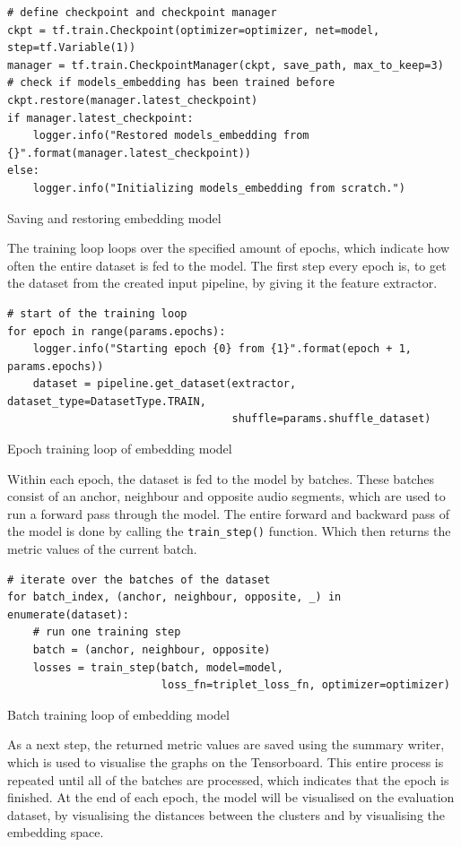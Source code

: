 \begin{code}[htbp]
\begin{verbatim}
# define checkpoint and checkpoint manager
ckpt = tf.train.Checkpoint(optimizer=optimizer, net=model, step=tf.Variable(1))
manager = tf.train.CheckpointManager(ckpt, save_path, max_to_keep=3)
# check if models_embedding has been trained before
ckpt.restore(manager.latest_checkpoint)
if manager.latest_checkpoint:
    logger.info("Restored models_embedding from {}".format(manager.latest_checkpoint))
else:
    logger.info("Initializing models_embedding from scratch.")
\end{verbatim}
\caption{Saving and restoring embedding model}
\label{code:Save-Restore-Embedding-Model}
\end{code}
\noindent
The training loop loops over the specified amount of epochs, which indicate how often the entire dataset is fed to the model. The first step every epoch is, to get the dataset from the created input pipeline, by giving it the feature extractor.

\begin{code}[htbp]
\begin{verbatim}
# start of the training loop
for epoch in range(params.epochs):
    logger.info("Starting epoch {0} from {1}".format(epoch + 1, params.epochs))
    dataset = pipeline.get_dataset(extractor, dataset_type=DatasetType.TRAIN,
                                   shuffle=params.shuffle_dataset)
\end{verbatim}
\caption{Epoch training loop of embedding model}
\label{code:Epoch-Loop-Embedding-Model}
\end{code}
\noindent
Within each epoch, the dataset is fed to the model by batches. These batches consist of an anchor, neighbour and opposite audio segments, which are used to run a forward pass through the model. The entire forward and backward pass of the model is done by calling the \texttt{train\_step()} function. Which then returns the metric values of the current batch.

\begin{code}[htbp]
\begin{verbatim}
# iterate over the batches of the dataset
for batch_index, (anchor, neighbour, opposite, _) in enumerate(dataset):
    # run one training step
    batch = (anchor, neighbour, opposite)
    losses = train_step(batch, model=model, 
                        loss_fn=triplet_loss_fn, optimizer=optimizer)
\end{verbatim}
\caption{Batch training loop of embedding model}
\label{code:Batch-Loop-Embedding-Model}
\end{code}
\noindent
As a next step, the returned metric values are saved using the summary writer, which is used to visualise the graphs on the Tensorboard. This entire process is repeated until all of the batches are processed, which indicates that the epoch is finished. At the end of each epoch, the model will be visualised on the evaluation dataset, by visualising the distances between the clusters and by visualising the embedding space.

